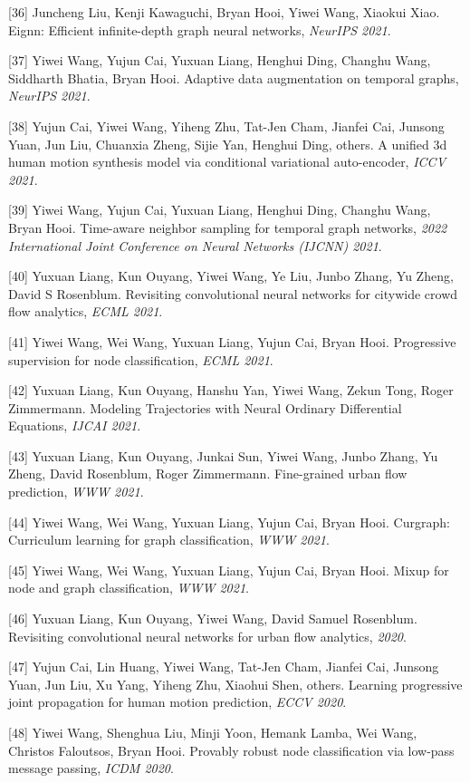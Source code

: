 [36] Juncheng Liu, Kenji Kawaguchi, Bryan Hooi, Yiwei Wang, Xiaokui Xiao. Eignn: Efficient infinite-depth graph neural networks, \textit{NeurIPS 2021}.

[37] Yiwei Wang, Yujun Cai, Yuxuan Liang, Henghui Ding, Changhu Wang, Siddharth Bhatia, Bryan Hooi. Adaptive data augmentation on temporal graphs, \textit{NeurIPS 2021}.

[38] Yujun Cai, Yiwei Wang, Yiheng Zhu, Tat-Jen Cham, Jianfei Cai, Junsong Yuan, Jun Liu, Chuanxia Zheng, Sijie Yan, Henghui Ding, others. A unified 3d human motion synthesis model via conditional variational auto-encoder, \textit{ICCV 2021}.

[39] Yiwei Wang, Yujun Cai, Yuxuan Liang, Henghui Ding, Changhu Wang, Bryan Hooi. Time-aware neighbor sampling for temporal graph networks, \textit{2022 International Joint Conference on Neural Networks (IJCNN) 2021}.

[40] Yuxuan Liang, Kun Ouyang, Yiwei Wang, Ye Liu, Junbo Zhang, Yu Zheng, David S Rosenblum. Revisiting convolutional neural networks for citywide crowd flow analytics, \textit{ECML 2021}.

[41] Yiwei Wang, Wei Wang, Yuxuan Liang, Yujun Cai, Bryan Hooi. Progressive supervision for node classification, \textit{ECML 2021}.

[42] Yuxuan Liang, Kun Ouyang, Hanshu Yan, Yiwei Wang, Zekun Tong, Roger Zimmermann. Modeling Trajectories with Neural Ordinary Differential Equations, \textit{IJCAI 2021}.

[43] Yuxuan Liang, Kun Ouyang, Junkai Sun, Yiwei Wang, Junbo Zhang, Yu Zheng, David Rosenblum, Roger Zimmermann. Fine-grained urban flow prediction, \textit{WWW 2021}.

[44] Yiwei Wang, Wei Wang, Yuxuan Liang, Yujun Cai, Bryan Hooi. Curgraph: Curriculum learning for graph classification, \textit{WWW 2021}.

[45] Yiwei Wang, Wei Wang, Yuxuan Liang, Yujun Cai, Bryan Hooi. Mixup for node and graph classification, \textit{WWW 2021}.

[46] Yuxuan Liang, Kun Ouyang, Yiwei Wang, David Samuel Rosenblum. Revisiting convolutional neural networks for urban flow analytics, \textit{ 2020}.

[47] Yujun Cai, Lin Huang, Yiwei Wang, Tat-Jen Cham, Jianfei Cai, Junsong Yuan, Jun Liu, Xu Yang, Yiheng Zhu, Xiaohui Shen, others. Learning progressive joint propagation for human motion prediction, \textit{ECCV 2020}.

[48] Yiwei Wang, Shenghua Liu, Minji Yoon, Hemank Lamba, Wei Wang, Christos Faloutsos, Bryan Hooi. Provably robust node classification via low-pass message passing, \textit{ICDM 2020}.

